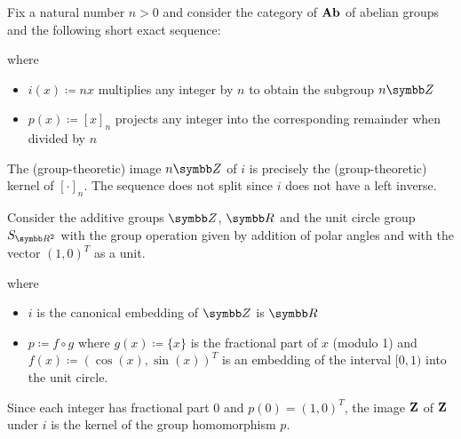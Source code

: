 \begin{example}\label{ex:short_exact_sequences}
  \mbox{}
  \begin{defenum}
    \item\label{ex:short_exact_sequences/cyclic_groups} Fix a natural number $n > 0$ and consider the category of $\operatorname{\mathbf{Ab}}$ of abelian groups and the following short exact sequence:
    \begin{Center}
    \end{Center}
    where
    \begin{itemize}
      \item $i(x) \coloneqq nx$ multiplies any integer by $n$ to obtain the subgroup $n \BB{Z}$
      \item $p(x) \coloneqq [x]_n$ projects any integer into the corresponding remainder when divided by $n$
    \end{itemize}

    The (group-theoretic) image $n \BB{Z}$ of $i$ is precisely the (group-theoretic) kernel of $[\cdot]_n$. The sequence does not split since $i$ does not have a left inverse.

    \item\label{ex:short_exact_sequences/real_number_splitting} Consider the additive groups $\BB{Z}$, $\BB{R}$ and the unit circle group $S_{\BB{R}^2}$ with the group operation given by addition of polar angles and with the vector $(1, 0)^T$ as a unit.
    \begin{Center}
    \end{Center}
    where
    \begin{itemize}
      \item $i$ is the canonical embedding of $\BB{Z}$ is $\BB{R}$
      \item $p \coloneqq f \circ g$ where $g(x) \coloneqq \{ x \}$ is the fractional part of $x$ (modulo 1) and $f(x) \coloneqq (\cos(x), \sin(x))^T$ is an embedding of the interval $[0, 1)$ into the unit circle.
    \end{itemize}

    Since each integer has fractional part $0$ and $p(0) = (1, 0)^T$, the image $\operatorname{\mathbf{Z}}$ of $\operatorname{\mathbf{Z}}$ under $i$ is the kernel of the group homomorphism $p$.


\end{defenum}
\end{example}
